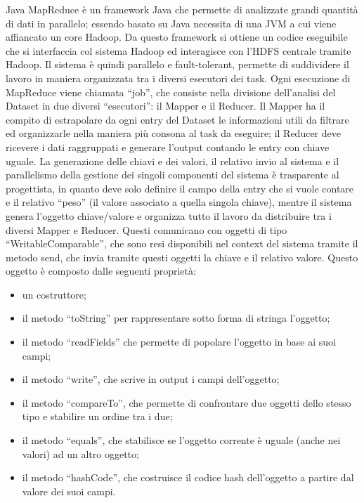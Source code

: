 \documentclass[11pt]{article} %
\begin{document}
Java MapReduce è un framework Java che permette di analizzate grandi quantità di dati in parallelo; essendo basato su Java necessita di una JVM a cui viene affiancato un core Hadoop. Da questo framework si ottiene un codice eseguibile che si interfaccia col sistema Hadoop ed interagisce con l'HDFS centrale tramite Hadoop. Il sistema è quindi parallelo e fault-tolerant, permette di suddividere il lavoro in maniera organizzata tra i diversi esecutori dei task. Ogni esecuzione di MapReduce viene chiamata ``job'', che consiste nella divisione dell'analisi del Dataset in due diversi ``esecutori'': il Mapper e il Reducer. Il Mapper ha il compito di estrapolare da ogni entry del Dataset le informazioni utili da filtrare ed organizzarle nella maniera più consona al task da eseguire; il Reducer deve ricevere i dati raggruppati e generare l'output contando le entry con chiave uguale. La generazione delle chiavi e dei valori, il relativo invio al sistema e il parallelismo della gestione dei singoli componenti del sistema è trasparente al progettista, in quanto deve solo definire il campo della entry che si vuole contare e il relativo ``peso'' (il valore associato a quella singola chiave), mentre il sistema genera l'oggetto chiave/valore e organizza tutto il lavoro da distribuire tra i diversi Mapper e Reducer.  Questi comunicano con oggetti di tipo ``WritableComparable'', che sono resi disponibili nel context del sistema tramite il metodo send, che invia tramite questi oggetti la chiave e il relativo valore. Questo oggetto è composto dalle seguenti proprietà:
\begin{itemize}
\item  un costruttore; 
\item il metodo ``toString'' per rappresentare sotto forma di stringa l'oggetto; 
\item il metodo ``readFields'' che permette di popolare l'oggetto in base ai suoi campi; 
\item il metodo ``write'', che scrive in output i campi dell'oggetto; 
\item il metodo ``compareTo'', che permette di confrontare due oggetti dello stesso tipo e stabilire un ordine tra i due;
\item il metodo ``equals'', che stabilisce se l'oggetto corrente è uguale (anche nei valori) ad un altro oggetto;
\item il metodo ``hashCode'', che costruisce il codice hash dell'oggetto a partire dal valore dei suoi campi.
\end{itemize}
\end{document}
